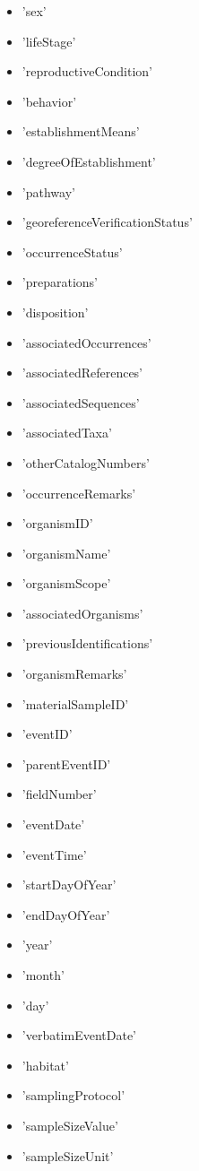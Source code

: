 \documentclass[a4paper]{book}
\begin{document}
\begin{Details}
\begin{itemize}
\item{} 'sex'
\item{} 'lifeStage'
\item{} 'reproductiveCondition'
\item{} 'behavior'
\item{} 'establishmentMeans'
\item{} 'degreeOfEstablishment'
\item{} 'pathway'
\item{} 'georeferenceVerificationStatus' 
\item{} 'occurrenceStatus' 
\item{} 'preparations'
\item{} 'disposition'
\item{} 'associatedOccurrences'
\item{} 'associatedReferences'
\item{} 'associatedSequences'
\item{} 'associatedTaxa'
\item{} 'otherCatalogNumbers'
\item{} 'occurrenceRemarks'
\item{} 'organismID'
\item{} 'organismName'
\item{} 'organismScope'
\item{} 'associatedOrganisms'
\item{} 'previousIdentifications'
\item{} 'organismRemarks'
\item{} 'materialSampleID'
\item{} 'eventID'
\item{} 'parentEventID'
\item{} 'fieldNumber'
\item{} 'eventDate' 
\item{} 'eventTime'
\item{} 'startDayOfYear'
\item{} 'endDayOfYear'
\item{} 'year' 
\item{} 'month' 
\item{} 'day' 
\item{} 'verbatimEventDate'
\item{} 'habitat' 
\item{} 'samplingProtocol'
\item{} 'sampleSizeValue'
\item{} 'sampleSizeUnit'

\end{itemize}
\end{Details}
\end{document}
